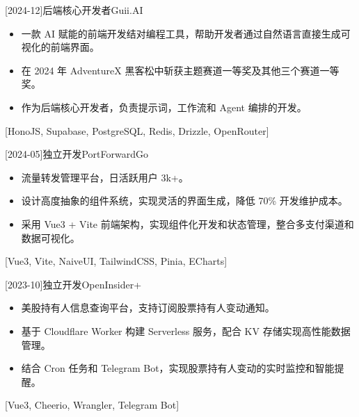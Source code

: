 \documentclass[zh]{resume}
\begin{document}
\begin{projects}
  [2024-12]{后端核心开发者}{}{Guii.AI}{
    \begin{itemize}
      \item 一款 AI 赋能的前端开发结对编程工具，帮助开发者通过自然语言直接生成可视化的前端界面。
      \item 在 2024 年 AdventureX 黑客松中斩获主题赛道一等奖及其他三个赛道一等奖。
      \item 作为后端核心开发者，负责提示词，工作流和 Agent 编排的开发。
    \end{itemize}
  }[HonoJS, Supabase, PostgreSQL, Redis, Drizzle, OpenRouter]

  \separator{0.5ex}
  [2024-05]{独立开发}{}{PortForwardGo}{
    \begin{itemize}
      \item 流量转发管理平台，日活跃用户 3k+。
      \item 设计高度抽象的组件系统，实现灵活的界面生成，降低 70\% 开发维护成本。
      \item 采用 Vue3 + Vite 前端架构，实现组件化开发和状态管理，整合多支付渠道和数据可视化。
    \end{itemize}
  }[Vue3, Vite, NaiveUI, TailwindCSS, Pinia, ECharts]

  \separator{0.5ex}
  [2023-10]{独立开发}{}{OpenInsider+}{
    \begin{itemize}
      \item 美股持有人信息查询平台，支持订阅股票持有人变动通知。
      \item 基于 Cloudflare Worker 构建 Serverless 服务，配合 KV 存储实现高性能数据管理。
      \item 结合 Cron 任务和 Telegram Bot，实现股票持有人变动的实时监控和智能提醒。
    \end{itemize}
  }[Vue3, Cheerio, Wrangler, Telegram Bot]
\end{projects}
\end{document}
